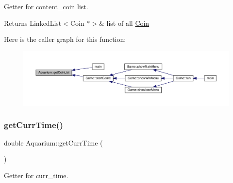 Getter for content\+\_\+coin list. 

\begin{DoxyReturn}{Returns}
Linked\+List$<$\+Coin $\ast$$>$\& list of all \mbox{\hyperlink{class_coin}{Coin}} 
\end{DoxyReturn}
Here is the caller graph for this function\+:
\nopagebreak
\begin{figure}[H]
\begin{center}
\leavevmode
\includegraphics[width=350pt]{class_aquarium_a3b3592004ace881a5e11d19a8dc127e4_icgraph}
\end{center}
\end{figure}
\mbox{\label{class_aquarium_aae7158daf192a78ffaf165285386221f}} 
\subsubsection{\texorpdfstring{get\+Curr\+Time()}{getCurrTime()}}
{\footnotesize\ttfamily double Aquarium\+::get\+Curr\+Time (\begin{DoxyParamCaption}{ }\end{DoxyParamCaption})}



Getter for curr\+\_\+time. 

